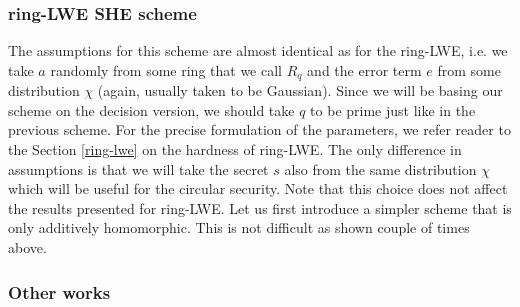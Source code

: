 \subsubsection*{ring-LWE SHE scheme}
The assumptions for this scheme are almost identical as for the ring-LWE, i.e. we take $a$ randomly from some ring that we call $R_q$ and the error term $e$ from some distribution $\chi$ (again, usually taken to be Gaussian). Since we will be basing our scheme on the decision version, we should take $q$ to be prime just like in the previous scheme. For the precise formulation of the parameters, we refer reader to the Section \ref{ring-lwe} on the hardness of ring-LWE. The only difference in assumptions is that we will take the secret $s$ also from the same distribution $\chi$ which will be useful for the circular security. Note that this choice does not affect the results presented for ring-LWE.
Let us first introduce a simpler scheme that is only additively homomorphic. This is not difficult as shown couple of times above. 


\subsubsection{Other works}

